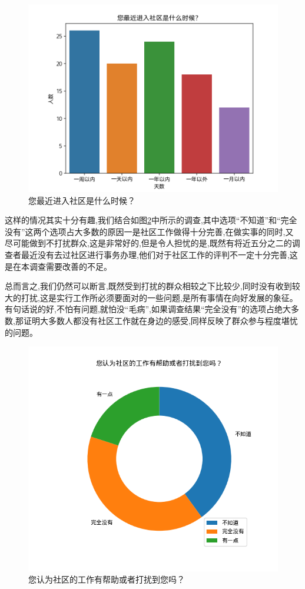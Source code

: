 \documentclass[AutoFakeBold]{LZUThesis}
\begin{document}
\begin{figure}[!h]
	\centering
	\includegraphics[width=4 in]{figures/lastCom.png}
	\caption{您最近进入社区是什么时候？}
	\label{fig:lastCom}
\end{figure}

这样的情况其实十分有趣,我们结合如图\ref{fig:bother}中所示的调查,其中选项“不知道”和“完全没有”这两个选项占大多数的原因一是社区工作做得十分完善,在做实事的同时,又尽可能做到不打扰群众,这是非常好的,但是令人担忧的是,既然有将近五分之二的调查者最近没有去过社区进行事务办理,他们对于社区工作的评判不一定十分完善,这是在本调查需要改善的不足。

总而言之,我们仍然可以断言,既然受到打扰的群众相较之下比较少,同时没有收到较大的打扰,这是实行工作所必须要面对的一些问题,是所有事情在向好发展的象征。有句话说的好,不怕有问题,就怕没“毛病”,如果调查结果“完全没有”的选项占绝大多数,那证明大多数人都没有社区工作就在身边的感受,同样反映了群众参与程度堪忧的问题。

\begin{figure}[!h]
	\centering
	\includegraphics[width=4 in]{figures/bother.png}
	\caption{您认为社区的工作有帮助或者打扰到您吗？}
	\label{fig:bother}
\end{figure}
\end{document}
